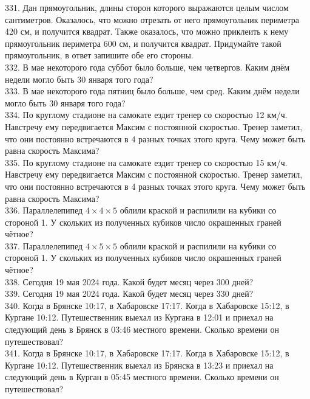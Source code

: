 331. Дан прямоугольник, длины сторон которого выражаются целым числом сантиметров. Оказалось, что можно отрезать от него прямоугольник периметра 420 см, и получится квадрат. Также оказалось, что можно приклеить к нему прямоугольник периметра 600 см, и получится квадрат. Придумайте такой прямоугольник, в ответ запишите обе его стороны.\\
332. В мае некоторого года суббот было больше, чем четвергов. Каким днём недели могло быть 30 января того года?\\
333. В мае некоторого года пятниц было больше, чем сред. Каким днём недели могло быть 30 января того года?\\
334. По круглому стадионе на самокате ездит тренер со скоростью 12 км/ч. Навстречу ему передвигается Максим с постоянной скоростью. Тренер заметил, что они постоянно встречаются в 4 разных точках этого круга. Чему может быть равна скорость Максима?\\
335. По круглому стадионе на самокате ездит тренер со скоростью 15 км/ч. Навстречу ему передвигается Максим с постоянной скоростью. Тренер заметил, что они постоянно встречаются в 4 разных точках этого круга. Чему может быть равна скорость Максима?\\
336. Параллелепипед $4\times4\times5$ облили краской и распилили на кубики со стороной 1. У скольких из полученных кубиков число окрашенных граней чётное?\\
337. Параллелепипед $4\times5\times5$ облили краской и распилили на кубики со стороной 1. У скольких из полученных кубиков число окрашенных граней чётное?\\
338. Сегодня 19 мая 2024 года. Какой будет месяц через 300 дней?\\
339. Сегодня 19 мая 2024 года. Какой будет месяц через 330 дней?\\
340. Когда в Брянске 10:17, в Хабаровске 17:17. Когда в Хабаровске 15:12, в Кургане 10:12. Путешественник выехал из Кургана в 12:01 и приехал на следующий день в Брянск в 03:46 местного времени. Сколько времени он путешествовал?\\
341. Когда в Брянске 10:17, в Хабаровске 17:17. Когда в Хабаровске 15:12, в Кургане 10:12. Путешественник выехал из Брянска в 13:23 и приехал на следующий день в Курган в 05:45 местного времени. Сколько времени он путешествовал?
\newpage
